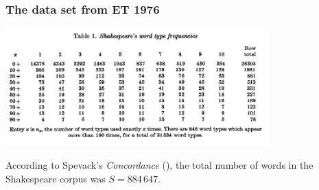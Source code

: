 \begin{frame}
    \frametitle{The data set from ET 1976}
    \begin{center}
        \includegraphics[width=4in]{../compendium/Figures/ET-Table1.pdf}        
    \end{center}
	
	According to Spevack's \textit{Concordance} (\citeyear{Spevack:1968qd}), the total number of words in the Shakespeare corpus was $S=884\,647$.
\end{frame}
